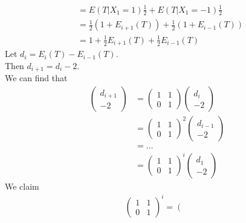 \documentclass{extarticle}
\theoremstyle{plain}
\theoremstyle{definition}
\begin{document}
\begin{enumerate}[(a)]
\begin{align*}
	  	  		 &= E(T|X_1 = 1) \frac{1}{2} + E(T|X_1 = -1)\frac{1}{2} \\
	  	  		 &=\frac{1}{2}\left(1+E_{i+1}(T)\right) + \frac{1}{2}\left(1+E_{i-1}(T)\right)\\
	  	  		 &=1+\frac{1}{2}E_{i+1}(T) + \frac{1}{2}E_{i-1}(T)		
	  	\end{align*} 
		Let $d_i = E_i(T) - E_{i-1}(T)$.\\
		Then $d_{i+1} = d_i - 2$.\\
		We can find that 
		\begin{align*}
		  \left( \begin{array}{c}
		  	d_{i+1} \\
		  	-2
		  \end{array}
		  \right)
		   &= 
		  \left( 
		  		\begin{array}{cc}
		  		  1& 1 \\
		  		  0& 1
		  		\end{array}
		  \right)
		  \left( \begin{array}{c}
		  	d_{i} \\
		  	-2
		  \end{array}
		  \right) \\
		  &= 
		  \left( 
		  		\begin{array}{cc}
		  		  1& 1 \\
		  		  0& 1
		  		\end{array}
		  \right)^2
		  \left( \begin{array}{c}
		  	d_{i-1} \\
		  	-2
		  \end{array}
			\right) \\
		&= \ldots \\
		&=
		  \left( 
		  		\begin{array}{cc}
		  		  1& 1 \\
		  		  0& 1
		  		\end{array}
		  	  \right)^{i}
		  \left( \begin{array}{c}
		  	d_{1} \\
			-2
		  \end{array}
		\right) 
		\end{align*}
	We claim 
	\begin{align*}
		\left( 
		  		\begin{array}{cc}
		  		  1& 1 \\
		  		  0& 1
		  		\end{array}
		  \right)^i
		  =
		 \left( 
		  		\begin{array}{cc}

\end{array}
\end{align*}
\end{enumerate}
\end{document}

